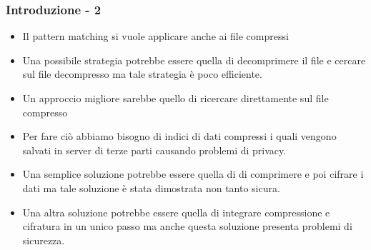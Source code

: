 \documentclass{beamer}
\begin{document}
\begin{frame}
\frametitle{Introduzione - 2}
	\begin{itemize}
		\item Il pattern matching si vuole applicare anche ai file compressi
		\pause
		\item Una possibile strategia potrebbe essere quella di decomprimere il file e cercare sul file decompresso ma tale strategia è poco efficiente.
		\pause
		\item Un approccio migliore sarebbe quello di ricercare direttamente sul file compresso 
		\item Per fare ciò abbiamo bisogno di indici di dati compressi i quali vengono salvati in server di terze parti causando problemi di privacy. 
		\pause
		\item Una semplice soluzione potrebbe essere quella di di comprimere e poi cifrare i dati ma tale soluzione è stata dimostrata non tanto sicura.
		\pause
		\item Una altra soluzione potrebbe essere quella di integrare compressione e cifratura in un unico passo ma anche questa soluzione presenta problemi di sicurezza.
		
	\end{itemize}
\end{frame}
\end{document}
